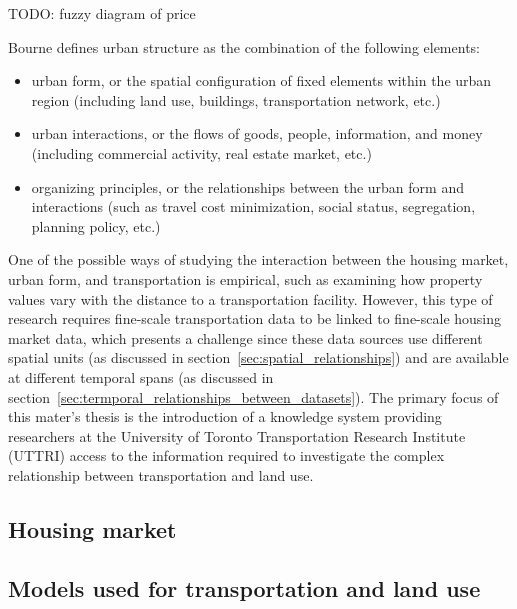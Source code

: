 TODO: fuzzy diagram of price

Bourne\cite{Bourne1982} defines urban structure as the combination of the following elements:
\begin{itemize}
    \item urban form, or the spatial configuration of fixed elements within the urban region (including land use, buildings, transportation network, etc.)
    \item urban interactions, or the flows of goods, people, information, and money (including commercial activity, real estate market, etc.)
    \item organizing principles, or the relationships between the urban form and interactions (such as travel cost minimization, social status, segregation, planning policy, etc.)
\end{itemize}


One of the possible ways of studying the interaction between the housing market, urban form, and transportation is empirical, such as examining how property values vary with the distance to a transportation facility\cite{Sherry1999}.
However, this type of research requires fine-scale transportation data to be linked to fine-scale housing market data, which presents a challenge since these data sources use different spatial units (as discussed in section~\ref{sec:spatial_relationships}) and are available at different temporal spans (as discussed in section~\ref{sec:termporal_relationships_between_datasets}).
The primary focus of this mater's thesis is the introduction of a knowledge system providing researchers at the University of Toronto Transportation Research Institute (UTTRI) access to the information required to investigate the complex relationship between transportation and land use.

\subsection{Housing market} \label{subsec:housing_market}

\subsection{Models used for transportation and land use} \label{subsec:transportation_land_use_interaction}


